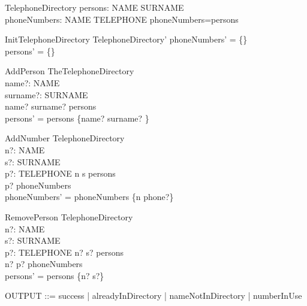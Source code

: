 \documentclass{article}
\begin{document}
\begin{zed}
[NAME] 
\end{zed}

\begin{zed}
[SURNAME]
\end{zed}

\begin{schema}{TelephoneDirectory}
persons: NAME \fun SURNAME \\ 
phoneNumbers: NAME \pfun TELEPHONE
\where 
\dom phoneNumbers=\dom persons
\end{schema}

\begin{schema}{InitTelephoneDirectory} 
TelephoneDirectory' 
\where 
phoneNumbers' = \{\} \\
persons' = \{\}
\end{schema}

\begin{schema}{AddPerson}
TheTelephoneDirectory \\
name?: NAME \\
surname?: SURNAME \\
\where
name? \mapsto surname? \notin persons\\
persons' = persons \cup \{name? \mapsto surname? \}
\end{schema}

\begin{schema}{AddNumber}
\Delta TelephoneDirectory \\
n?: NAME \\
s?: SURNAME \\
p?: TELEPHONE
\where
n \mapsto s \in persons\\
p? \notin \ran phoneNumbers \\
phoneNumbers' = phoneNumbers \cup \{n \mapsto phone?\}
\end{schema}

\begin{schema}{RemovePerson}
\Delta TelephoneDirectory \\
n?: NAME \\
s?: SURNAME \\
p?: TELEPHONE
\where
n? \mapsto s? \in persons\\
n? \mapsto p? \notin phoneNumbers \\
persons' = persons \setminus \{n? \mapsto s?\}
\end{schema}

\begin{zed}
OUTPUT ::= success | alreadyInDirectory | nameNotInDirectory | numberInUse
\end{zed}
\end{document}
